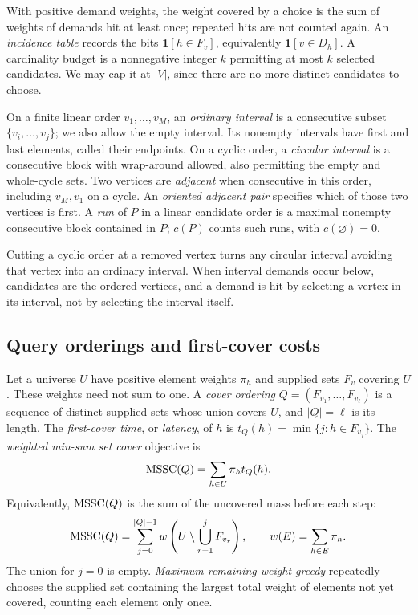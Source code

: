 With positive demand weights, the weight covered by a choice is
the sum of weights of demands hit at least once; repeated hits
are not counted again. An \emph{incidence table} records the bits
$\mathbf1[h\in F_v]$, equivalently $\mathbf1[v\in D_h]$.
A cardinality budget is a nonnegative integer $k$ permitting at
most $k$ selected candidates. We may cap it at $|V|$, since there
are no more distinct candidates to choose.

\begin{definition}\label{def:ordered-intervals}
On a finite linear order $v_1,\ldots,v_M$, an \emph{ordinary
interval} is a consecutive subset $\{v_i,\ldots,v_j\}$; we also
allow the empty interval. Its nonempty intervals have first and
last elements, called their endpoints.
On a cyclic order, a \emph{circular interval} is a consecutive
block with wrap-around allowed, also permitting the empty and
whole-cycle sets. Two vertices are \emph{adjacent} when consecutive
in this order, including $v_M,v_1$ on a cycle. An \emph{oriented
adjacent pair} specifies which of those two vertices is first.
A \emph{run} of $P$ in a linear candidate order is a maximal
nonempty consecutive block contained in $P$; $c(P)$ counts such
runs, with $c(\varnothing)=0$.
\end{definition}

Cutting a cyclic order at a removed vertex turns any circular
interval avoiding that vertex into an ordinary interval.
When interval demands occur below, candidates are the ordered
vertices, and a demand is hit by selecting a vertex in its interval,
not by selecting the interval itself.

\subsection{Query orderings and first-cover costs}

Let a universe $U$ have positive element weights $\pi_h$ and supplied
sets $F_v$ covering $U$. These weights need not sum to one.
A \emph{cover ordering}
$Q=(F_{v_1},\ldots,F_{v_\ell})$ is a sequence of distinct supplied
sets whose union covers $U$, and $|Q|=\ell$ is its length.
The \emph{first-cover time}, or \emph{latency}, of $h$ is
$t_Q(h)=\min\{j:h\in F_{v_j}\}$.
The \emph{weighted min-sum set cover} objective is
\[
 \operatorname{MSSC}(Q)=\sum_{h\in U}\pi_h t_Q(h).
\]
Equivalently, $\operatorname{MSSC}(Q)$ is the sum of the uncovered mass before
each step:
\[
 \operatorname{MSSC}(Q)=
 \sum_{j=0}^{|Q|-1}
 w\left(U\setminus\bigcup_{r=1}^{j}F_{v_r}\right),
 \qquad w(E)=\sum_{h\in E}\pi_h.
\]
The union for $j=0$ is empty. \emph{Maximum-remaining-weight greedy}
repeatedly chooses the supplied set containing the largest total
weight of elements not yet covered, counting each element only once.

